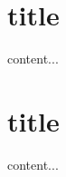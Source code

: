 \documentclass{beamer}
\begin{document}
\section{title}
\begin{frame}
content...
\end{frame}

\section{title}
\begin{frame}
content...
\end{frame}
\end{document}
